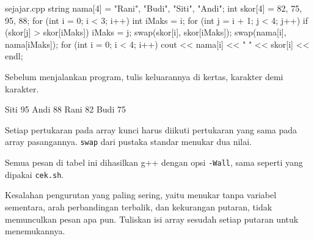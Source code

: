 \documentclass[a4paper]{article}
\begin{document}
\begin{MKode}{sejajar.cpp}
string nama[4] = {"Rani", "Budi", "Siti", "Andi"};
int skor[4] = {82, 75, 95, 88};
for (int i = 0; i < 3; i++) {
    int iMaks = i;
    for (int j = i + 1; j < 4; j++)
        if (skor[j] > skor[iMaks]) iMaks = j;
    swap(skor[i], skor[iMaks]);
    swap(nama[i], nama[iMaks]);
}
for (int i = 0; i < 4; i++)
    cout << nama[i] << " " << skor[i] << endl;
\end{MKode}
\begin{Tebak}[]
Sebelum menjalankan program, tulis keluarannya di kertas, karakter demi karakter.
\end{Tebak}
\begin{Jawaban}[]
\begin{MKeluaran}[]
Siti 95
Andi 88
Rani 82
Budi 75
\end{MKeluaran}
Setiap pertukaran pada array kunci harus diikuti pertukaran yang sama pada array pasangannya. \texttt{swap} dari pustaka standar menukar dua nilai.
\end{Jawaban}
Semua pesan di tabel ini dihasilkan g++ dengan opsi \texttt{-Wall}, sama seperti yang dipakai \texttt{cek.sh}.
\par\vspace{4pt}\par\vspace{6pt}
Kesalahan pengurutan yang paling sering, yaitu menukar tanpa variabel sementara, arah perbandingan terbalik, dan kekurangan putaran, tidak memunculkan pesan apa pun. Tuliskan isi array sesudah setiap putaran untuk menemukannya.
\end{document}
